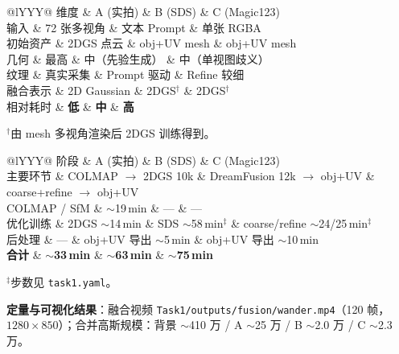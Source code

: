 \documentclass[10pt,twocolumn,letterpaper]{article}
\newcommand{\cvprtable}[1]{%
  \scriptsize
  \setlength{\tabcolsep}{2.5pt}%
  \renewcommand{\arraystretch}{1.08}%
  #1%
}
\begin{document}
\begin{table}[t]
  \centering
  \caption{三种重建路径定性对比。}
  \label{tab:task1_compare}
  \cvprtable{%
  \begin{tabularx}{\linewidth}{@{}lYYY@{}}
    \toprule
    维度 & A (实拍) & B (SDS) & C (Magic123) \\
    \midrule
    输入 & 72 张多视角 & 文本 Prompt & 单张 RGBA \\
    初始资产 & 2DGS 点云 & obj+UV mesh & obj+UV mesh \\
    几何 & 最高 & 中（先验生成） & 中（单视图歧义） \\
    纹理 & 真实采集 & Prompt 驱动 & Refine 较细 \\
    融合表示 & 2D Gaussian & 2DGS$^\dagger$ & 2DGS$^\dagger$ \\
    相对耗时 & \textbf{低} & \textbf{中} & \textbf{高} \\
    \bottomrule
  \end{tabularx}%
  }
  \vspace{1pt}
  {\footnotesize $^\dagger$由 mesh 多视角渲染后 2DGS 训练得到。}
\end{table}

\begin{table}[t]
  \centering
  \caption{三种物体重建墙钟耗时（至初始三维资产；不含融合渲染）。}
  \label{tab:task1_time}
  \cvprtable{%
  \begin{tabularx}{\linewidth}{@{}lYYY@{}}
    \toprule
    阶段 & A (实拍) & B (SDS) & C (Magic123) \\
    \midrule
    主要环节 & COLMAP $\rightarrow$ 2DGS 10k & DreamFusion 12k $\rightarrow$ obj+UV & coarse+refine $\rightarrow$ obj+UV \\
    COLMAP / SfM & $\sim$19\,min & --- & --- \\
    优化训练 & 2DGS $\sim$14\,min & SDS $\sim$58\,min$^\ddagger$ & coarse/refine $\sim$24/25\,min$^\ddagger$ \\
    后处理 & --- & obj+UV 导出 $\sim$5\,min & obj+UV 导出 $\sim$10\,min \\
    \textbf{合计} & \textbf{$\sim$33\,min} & \textbf{$\sim$63\,min} & \textbf{$\sim$75\,min} \\
    \bottomrule
  \end{tabularx}%
  }
  \vspace{2pt}
  {\footnotesize $^\ddagger$步数见 \texttt{task1.yaml}。}
\end{table}

\textbf{定量与可视化结果}：融合视频 \texttt{Task1/outputs/fusion/wander.mp4}（120 帧，$1280{\times}850$）；合并高斯规模：背景 $\sim$410 万 / A $\sim$25 万 / B $\sim$2.0 万 / C $\sim$2.3 万。
\end{document}
